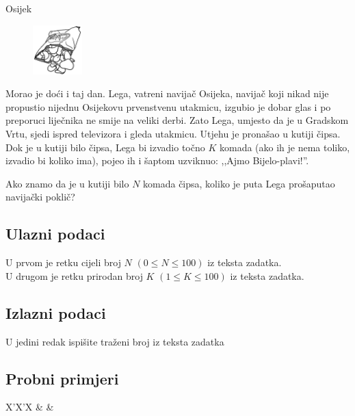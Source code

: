 \begin{statement}[
  problempoints=20,
  timelimit=1 sekunda,
  memorylimit=512 MiB,
]{Osijek}

\setlength\intextsep{-0.1cm}
\begin{figure}
\centering
\includegraphics[width=0.17\textwidth]{img/chips.png}
\end{figure}

Morao je doći i taj dan. Lega, vatreni navijač Osijeka, navijač koji nikad
nije propustio nijednu Osijekovu prvenstvenu utakmicu, izgubio je dobar glas
i po preporuci liječnika ne smije na veliki derbi. Zato Lega, umjesto da je u
Gradskom Vrtu, sjedi ispred televizora i gleda utakmicu. Utjehu je pronašao u
kutiji čipsa. Dok je u kutiji bilo čipsa, Lega bi izvadio točno $K$ komada (ako
ih je nema toliko, izvadio bi koliko ima), pojeo ih i šaptom uzviknuo: ,,Ajmo
Bijelo-plavi!''.

Ako znamo da je u kutiji bilo $N$ komada čipsa, koliko je puta
Lega prošaputao navijački poklič?

\subsection*{Ulazni podaci}
U prvom je retku cijeli broj $N$ $(0 \le N \le 100)$ iz teksta zadatka.\\
U drugom je retku prirodan broj $K$ $(1 \le K \le 100)$ iz teksta zadatka.

\subsection*{Izlazni podaci}
U jedini redak ispišite traženi broj iz teksta zadatka


\subsection*{Probni primjeri}
\begin{tabularx}{\textwidth}{X'X'X}
 &
 &
\end{tabularx}


\end{statement}
